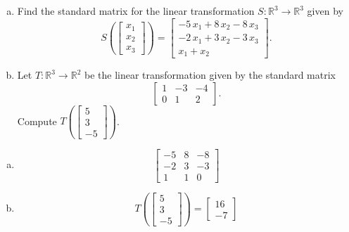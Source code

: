 
\begin{exerciseStatement}

\begin{enumerate}[(a)]
\item Find the standard matrix for the linear transformation \(S:\mathbb{R}^ 3  \to \mathbb{R}^ 3 \) given by \[S\left(  \left[\begin{array}{c}
x_{1} \\
x_{2} \\
x_{3}
\end{array}\right]  \right) =  \left[\begin{array}{c}
-5 \, x_{1} + 8 \, x_{2} - 8 \, x_{3} \\
-2 \, x_{1} + 3 \, x_{2} - 3 \, x_{3} \\
x_{1} + x_{2}
\end{array}\right] .\]
\item Let \(T:\mathbb{R}^ 3  \to \mathbb{R}^ 2 \) be the linear transformation given by the standard matrix \[ \left[\begin{array}{ccc}
1 & -3 & -4 \\
0 & 1 & 2
\end{array}\right] .\] Compute \(T\left( \left[\begin{array}{c}
5 \\
3 \\
-5
\end{array}\right]  \right)\). 
\end{enumerate}
    
\end{exerciseStatement}
    
\begin{exerciseAnswer} 

\begin{enumerate}[(a)]
\item \[ \left[\begin{array}{ccc}
-5 & 8 & -8 \\
-2 & 3 & -3 \\
1 & 1 & 0
\end{array}\right] \]
\item \[T\left( \left[\begin{array}{c}
5 \\
3 \\
-5
\end{array}\right]  \right)= \left[\begin{array}{c}
16 \\
-7
\end{array}\right] \]
\end{enumerate}
    
\end{exerciseAnswer}
    
